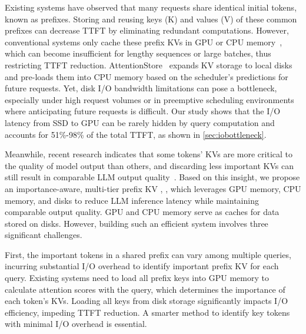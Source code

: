 Existing systems have observed that many requests share identical initial
tokens, known as prefixes. Storing and reusing keys (K) and values (V) of these common prefixes can decrease TTFT by eliminating redundant
computations. However, conventional systems only cache these prefix KVs in GPU
or CPU memory~\cite{promptcache-mlsys24,
sglang-arxiv23, ragcache-arxiv24, chunkattention-arxiv24}, which can become
insufficient for lengthy sequences or large batches, thus restricting TTFT
reduction. AttentionStore~\cite{attentionstore-atc24} expands KV storage to
local disks and pre-loads them into CPU memory based on the scheduler's
predictions for future requests. Yet, disk I/O bandwidth limitations can pose a
bottleneck, especially under high request volumes or in preemptive scheduling
environments where anticipating future requests is difficult.
Our study shows that the I/O latency from SSD to GPU can be rarely hidden by
query computation and accounts for 51\%-98\% of the total TTFT, as shown in
\cref{sec:iobottleneck}.


Meanwhile, recent research indicates that some tokens' KVs are more critical to
the quality of model output than others, and discarding less important KVs can
still result in comparable LLM output quality~\cite{h2o-nips23,
infinigen-osdi24, flexgen-icml23, scissorhands-nips23}. Based on this insight,
we propose an importance-aware, multi-tier prefix KV , \pname{},
which leverages GPU memory, CPU memory, and disks to reduce LLM inference latency
while maintaining comparable output quality. 
GPU and CPU memory serve as caches for data stored on disks.
However, building such an efficient system involves three significant challenges.

First, the important tokens in a shared prefix can vary among multiple queries,
incurring substantial I/O overhead to identify important prefix KV for each
query. Existing systems need to load all prefix keys into GPU
memory to calculate attention scores with the
query, which determines the importance of each token's KVs.
Loading all keys from disk storage significantly impacts I/O efficiency, impeding TTFT reduction. A smarter method to identify key tokens with minimal I/O overhead is essential.

